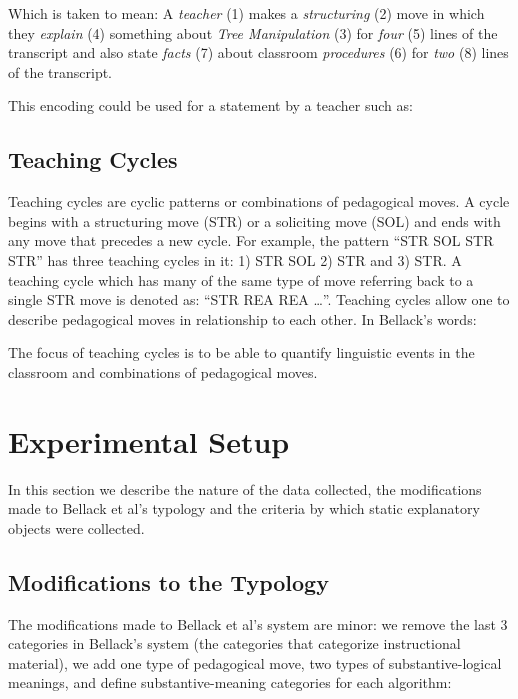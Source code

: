 \documentclass[conference]{IEEEtran}
\begin{document}
Which is taken to mean: A \emph{teacher} (1) makes a \emph{structuring} (2) move
in which they \emph{explain} (4) something about \emph{Tree Manipulation} (3) for
\emph{four} (5) lines of the transcript and also state \emph{facts} (7) about
classroom \emph{procedures} (6) for \emph{two} (8) lines of the transcript.

This encoding could be used for a statement by a teacher such as:


\subsection{Teaching Cycles}
Teaching cycles are cyclic patterns or combinations of pedagogical moves. A
cycle begins with a structuring move (STR) or a soliciting move (SOL) and ends
with any move that precedes a new cycle. For example, the pattern ``STR SOL STR
STR'' has three teaching cycles in it: 1) STR SOL 2) STR and 3) STR. A teaching
cycle which has many of the same type of move referring back to a single STR
move is denoted as: ``STR REA REA \ldots''. Teaching cycles allow one to
describe pedagogical moves in relationship to each other. In Bellack's words:


The focus of teaching cycles is to be able to quantify linguistic events in the
classroom and combinations of pedagogical moves. 

\section{Experimental Setup}
In this section we describe the nature of the data collected, the modifications
made to Bellack et al's typology and the criteria by which static explanatory
objects were collected.

\subsection{Modifications to the Typology}
The modifications made to Bellack et al's system are minor: we remove
the last 3 categories in Bellack's system (the categories that categorize
instructional material), we add one type of pedagogical move, two types of
substantive-logical meanings, and define substantive-meaning categories for each
algorithm:
\end{document}

